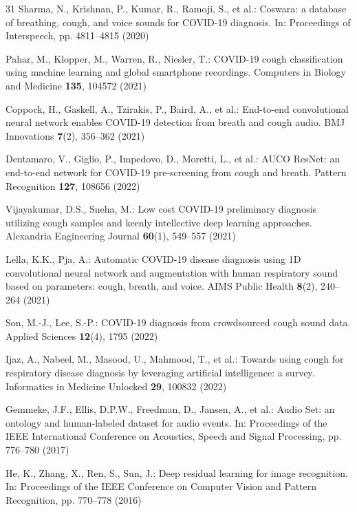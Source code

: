 \begin{thebibliography}{31}
Sharma, N., Krishnan, P., Kumar, R., Ramoji, S., et al.: Coswara: a database
of breathing, cough, and voice sounds for COVID-19 diagnosis. In: Proceedings
of Interspeech, pp. 4811--4815 (2020)

Pahar, M., Klopper, M., Warren, R., Niesler, T.: COVID-19 cough
classification using machine learning and global smartphone recordings.
Computers in Biology and Medicine \textbf{135}, 104572 (2021)

Coppock, H., Gaskell, A., Tzirakis, P., Baird, A., et al.: End-to-end
convolutional neural network enables COVID-19 detection from breath and cough
audio. BMJ Innovations \textbf{7}(2), 356--362 (2021)

Dentamaro, V., Giglio, P., Impedovo, D., Moretti, L., et al.: AUCO ResNet: an
end-to-end network for COVID-19 pre-screening from cough and breath. Pattern
Recognition \textbf{127}, 108656 (2022)

Vijayakumar, D.S., Sneha, M.: Low cost COVID-19 preliminary diagnosis
utilizing cough samples and keenly intellective deep learning approaches.
Alexandria Engineering Journal \textbf{60}(1), 549--557 (2021)

Lella, K.K., Pja, A.: Automatic COVID-19 disease diagnosis using 1D
convolutional neural network and augmentation with human respiratory sound
based on parameters: cough, breath, and voice. AIMS Public Health
\textbf{8}(2), 240--264 (2021)

Son, M.-J., Lee, S.-P.: COVID-19 diagnosis from crowdsourced cough sound data.
Applied Sciences \textbf{12}(4), 1795 (2022)

Ijaz, A., Nabeel, M., Masood, U., Mahmood, T., et al.: Towards using cough for
respiratory disease diagnosis by leveraging artificial intelligence: a survey.
Informatics in Medicine Unlocked \textbf{29}, 100832 (2022)

Gemmeke, J.F., Ellis, D.P.W., Freedman, D., Jansen, A., et al.: Audio Set: an
ontology and human-labeled dataset for audio events. In: Proceedings of the
IEEE International Conference on Acoustics, Speech and Signal Processing,
pp. 776--780 (2017)

He, K., Zhang, X., Ren, S., Sun, J.: Deep residual learning for image
recognition. In: Proceedings of the IEEE Conference on Computer Vision and
Pattern Recognition, pp. 770--778 (2016)


\end{thebibliography}
